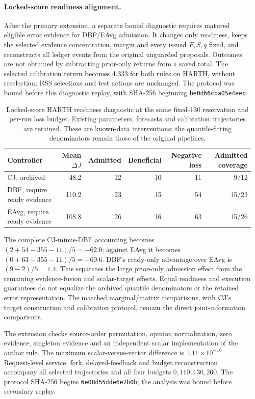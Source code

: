 \documentclass[10pt]{article}
\begin{document}
\paragraph{Locked-score readiness alignment.}
After the primary extension, a separate bound diagnostic requires matured
eligible error evidence for DBF/EAvg admission. It changes only readiness,
keeps the selected evidence concentration, margin and every issued
$F,S,q$ fixed, and reconstructs all ledger events from the original
unguarded proposals. Outcomes are not obtained by subtracting prior-only
returns from a saved total. The selected calibration return becomes 4.333
for both rules on HARTH, without reselection; RSS selections and test actions
are unchanged. The protocol was bound before this diagnostic replay,
with SHA-256 beginning \texttt{be0d66cba05e4eeb}.

\begin{table}[t]
\centering\small
\caption{Locked-score HARTH readiness diagnostic at the same fixed-130
reservation and per-run loss budget. Existing parameters, forecasts and
calibration trajectories are retained. These are known-data interventions;
the quantile-fitting denominators remain those of the original pipelines.}
\label{tab:dbf2025-ready-alignment}
\begin{tabular}{lrrrrr}
\toprule
Controller & Mean $\Delta J$ & Admitted & Beneficial
 & Negative loss & Admitted coverage\\
\midrule
CJ, archived & 48.2 & 12 & 10 & 11 & 9/12\\
DBF, require ready evidence & 110.2 & 23 & 15 & 54 & 15/23\\
EAvg, require ready evidence & 108.8 & 26 & 16 & 63 & 15/26\\
\bottomrule
\end{tabular}
\end{table}

The complete CJ-minus-DBF accounting becomes
$(2+54-355-11)/5=-62.0$; against EAvg it becomes
$(0+63-355-11)/5=-60.6$. DBF's ready-only advantage over EAvg is
$(9-2)/5=1.4$. This separates the large prior-only admission effect from
the remaining evidence-fusion and scalar-target effects. Equal readiness
and execution guarantees do not equalize the archived quantile denominators
or the retained error representation. The matched marginal/matrix
comparisons, with CJ's target construction and calibration protocol,
remain the direct joint-information comparisons.

The extension checks source-order permutation, opinion normalization,
zero evidence, singleton evidence and an independent scalar implementation
of the author rule. The maximum scalar-versus-vector difference is
$1.11\times10^{-16}$. Request-level service, fork, delayed-feedback and
budget reconstruction accompany all selected trajectories and all four
budgets $0,110,130,260$. The protocol SHA-256 begins
\texttt{6e08d55dde6e2b0b}; the analysis was bound before secondary replay.
\end{document}
